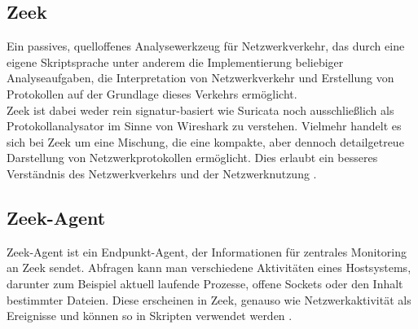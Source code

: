 \subsection{Zeek}
Ein passives, quelloffenes Analysewerkzeug für Netzwerkverkehr, das durch eine eigene Skriptsprache unter anderem die Implementierung beliebiger Analyseaufgaben, die Interpretation von Netzwerkverkehr und Erstellung von Protokollen auf der Grundlage dieses Verkehrs ermöglicht.\\
Zeek ist dabei weder rein signatur-basiert wie Suricata noch ausschließlich als Protokollanalysator im Sinne von Wireshark zu verstehen. Vielmehr handelt es sich bei Zeek um eine Mischung, die eine kompakte, aber dennoch detailgetreue Darstellung von Netzwerkprotokollen ermöglicht. Dies erlaubt ein besseres Verständnis des Netzwerkverkehrs und der Netzwerknutzung \cite{zeek_about_page}.

\subsection{Zeek-Agent}
Zeek-Agent ist ein Endpunkt-Agent, der Informationen für zentrales Monitoring an Zeek sendet.
Abfragen kann man verschiedene Aktivitäten eines Hostsystems, darunter zum Beispiel aktuell laufende Prozesse, offene Sockets oder den Inhalt bestimmter Dateien. Diese erscheinen in Zeek, genauso wie Netzwerkaktivität als Ereignisse und können so in Skripten verwendet werden \cite{zeek_agent}.

